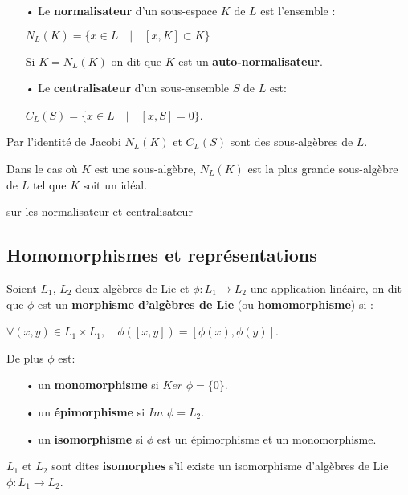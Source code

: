 \documentclass[a4paper,openany,12pt]{report}
\theoremstyle{break}
{\theorembodyfont{\upshape}
\newtheorem*{rmq}{Remarque :}
\newtheorem*{prv}{Preuve :}
\newtheorem*{ex}{Exemples :}
\newtheorem{exe}{Exemple : }
\newtheorem*{nota}{Notation :}}
\begin{document}
\begin{df}
\begin{itemize}

\item[•] Le \textbf{normalisateur} d'un sous-espace $K$ de $L$ est l'ensemble : 
 \begin{center}
$ N_{L}(K)=\{x \in L \quad |\quad [x,K] \subset K \} $ 
 \end{center}
Si $K = N_{L}(K)$ on dit que $K$ est un \textbf{auto-normalisateur}.

\item[•] Le \textbf{centralisateur} d'un sous-ensemble $S$ de $L$ est:
\begin{center}
$C_{L}(S) = \{x \in L\quad  | \quad [x,S]=0\}$.

\end{center} 
\end{itemize}
\end{df}

\begin{rmq} 
\quad Par l’identité de Jacobi $N_L(K)$ et $C_L(S)$ sont des sous-algèbres de $L$.

Dans le cas où $K$ est une sous-algèbre, $N_{L}(K)$ est la plus grande sous-algèbre de $L$ tel que $K$ soit un idéal.
\end{rmq}

\begin{exe}
sur les normalisateur et centralisateur
\end{exe}

\subsection{Homomorphismes et représentations}

\begin{df}
Soient $L_{1}$, $L_{2}$ deux algèbres de Lie et $\phi: L_{1} \rightarrow L_{2}$ une application linéaire, on dit que $\phi$ est un \textbf{morphisme d'algèbres de Lie} (ou \textbf{homomorphisme}) si :
\begin{center}
$ \forall(x, y) \in L_{1} \times L_{1}, \quad \phi([x, y])=[\phi(x), \phi(y)]$.
\end{center}
De plus $\phi$ est:
\begin{itemize}
\item[•] un \textbf{monomorphisme} si $Ker$ $\phi = \{ 0 \}$.
\item[•] un \textbf{épimorphisme} si $Im$ $\phi = L_{2}$.
\item[•] un \textbf{isomorphisme} si $\phi$ est un épimorphisme et un monomorphisme.
\end{itemize}
$L_{1}$ et $L_{2}$ sont dites \textbf{isomorphes} s'il existe un isomorphisme d'algèbres de Lie $\phi: L_{1} \rightarrow L_{2}$.  
\end{df}
\end{document}
